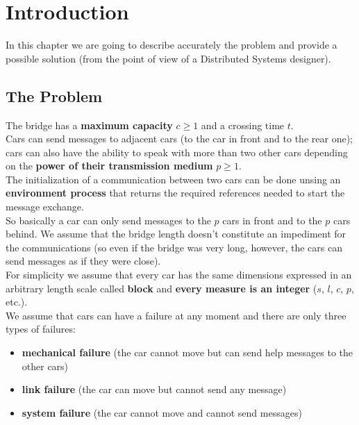 \chapter{Introduction}\label{ch:intro}

In this chapter we are going to describe accurately the problem and provide a possible 
solution (from the point of view of a Distributed Systems designer).\\


\section{The Problem}

The bridge has a \textbf{maximum capacity} $c \geq 1$ and a crossing time $t$. \\

Cars can send messages to adjacent cars (to the car in front and to the rear one); 
cars can also have the ability to speak with more than two other cars depending on the 
\textbf{power of their transmission medium} $p \geq 1$.\\

The initialization of a communication between two cars can be done unsing an 
\textbf{environment process} 
that returns the required references needed to start the message exchange.\\

So basically a car can only send messages to the $p$ cars in front and 
to the $p$ cars behind. We assume that the bridge length doesn't constitute an impediment 
for the communications (so even if the bridge was very long, however, 
the cars can send messages as if they were close).\\

For simplicity we assume that every car has the 
same dimensions expressed in an arbitrary length scale called \textbf{block} and 
\textbf{every measure is an integer} ($s$, $l$, $c$, $p$, etc.). \\

We assume that cars can have a failure at any moment and there are only 
three types of failures:
\begin{itemize}
    \item \textbf{mechanical failure} (the car cannot move but can send help messages to the other cars)
    \item \textbf{link failure} (the car can move but cannot send any message)
    \item \textbf{system failure} (the car cannot move and cannot send messages)
\end{itemize}

